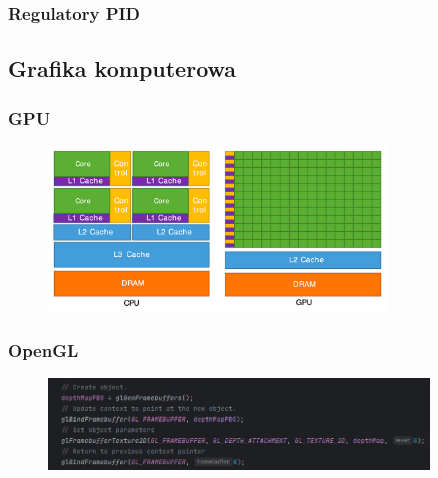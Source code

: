 \documentclass[aspectratio=169]{beamer}
\begin{document}
\begin{frame}[allowframebreaks]
	\frametitle{Regulatory PID}
	
\end{frame}

\subsection{Grafika komputerowa}

\begin{frame}
\frametitle{GPU}
	\begin{figure}
		\centering
		\includegraphics[width=0.8\textwidth]{gpu.png}
	\end{figure}
\end{frame}

\begin{frame}
\frametitle{OpenGL}
	\begin{figure}
		\centering
		\includegraphics[width=0.9\textwidth]{OpenGL_example.png}
	\end{figure}
\end{frame}
\end{document}
